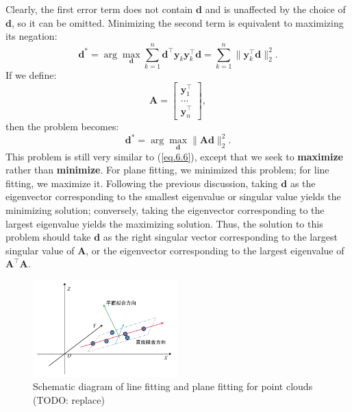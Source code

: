 Clearly, the first error term does not contain $\bm{d}$ and is unaffected by the choice of $\bm{d}$, so it can be omitted. Minimizing the second term is equivalent to maximizing its negation:
\begin{equation}\label{key}
	\bm{d}^* = \arg \max_{\bm{d}} \sum_{k=1}^{n} \bm{d}^\top \bm{y}_k\bm{y}_k^\top \bm{d} = \sum_{k=1}^{n} \| \bm{y}_k^\top \bm{d}\|_2^2.
\end{equation}
If we define:
\begin{equation}\label{key}
	\bm{A} = \begin{bmatrix}
		\bm{y}_1^\top \\
		\ldots \\
		\bm{y}_n^\top
	\end{bmatrix},
\end{equation}
then the problem becomes:
\begin{equation}\label{eq.6.33}
	\bm{d}^* = \arg \max_{\bm{d}} \| \bm{A} \bm{d} \|_2^2.
\end{equation}
This problem is still very similar to (\ref{eq.6.6}), except that we seek to \textbf{maximize} rather than \textbf{minimize}. For plane fitting, we minimized this problem; for line fitting, we maximize it. Following the previous discussion, taking $\bm{d}$ as the eigenvector corresponding to the smallest eigenvalue or singular value yields the minimizing solution; conversely, taking the eigenvector corresponding to the largest eigenvalue yields the maximizing solution. Thus, the solution to this problem should take $\bm{d}$ as the right singular vector corresponding to the largest singular value of $\bm{A}$, or the eigenvector corresponding to the largest eigenvalue of $\bm{A}^\top \bm{A}$.

\begin{figure}[!htp]
	\centering
	\includegraphics[width=0.5\textwidth]{resources/basic-point-cloud/linear-fitting.pdf}
	\caption{Schematic diagram of line fitting and plane fitting for point clouds (TODO: replace)}
	\label{fig:linear-fitting}
\end{figure}

